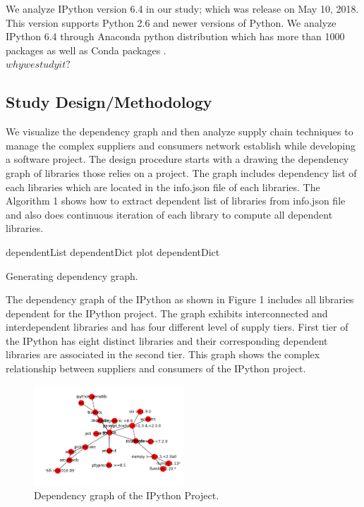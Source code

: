 \documentclass[10pt,conference]{IEEEtran}
\begin{document}
We analyze IPython version 6.4 in our study; which was release on May 10, 2018. This version supports Python 2.6 and newer versions of Python. We analyze IPython 6.4 through Anaconda python distribution which has more than 1000 packages as well as Conda packages \cite{}. \\ 

$why we study it?$

\subsection {Study Design/Methodology}
We visualize the dependency graph and then analyze supply chain techniques to manage the complex suppliers and consumers network establish while developing a software project. The design procedure starts with a drawing the dependency graph of libraries those relies on a project. The graph includes dependency list of each libraries which are located in the info.json file of each libraries. The Algorithm 1 shows how to extract dependent list of libraries from info.json file and also does continuous iteration of each library to compute all dependent libraries.

\begin{algorithm}
\SetAlgoLined
{}
 dependentList\;
 dependentDict\;
 plot dependentDict\; 
 
 \caption{Generating dependency graph.}
\end{algorithm}

The dependency graph of the IPython as shown in Figure 1 includes all libraries dependent for the IPython project. The graph exhibits interconnected and interdependent libraries and has four different level of supply tiers. First tier of the IPython has eight distinct libraries and their corresponding dependent libraries are associated in the second tier. This graph shows the complex relationship between suppliers and consumers of the IPython project.

\begin{figure}[h]
\includegraphics[width=0.5\textwidth , height=0.3\textheight]{dependency.png}
\caption{Dependency graph of the IPython Project.}
\end{figure}
\end{document}
